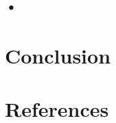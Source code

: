 \documentclass[12pt,final,oneside]{fithesis2}
\begin{document}
\section{•}

\chapter{Conclusion}







\begingroup
\def\tmpchapter{0}
\renewcommand{\chaptername}{}
\renewcommand{\thechapter}{}
\chapter{References}
\renewcommand{\chapter}[2]{}%



\end{document}
